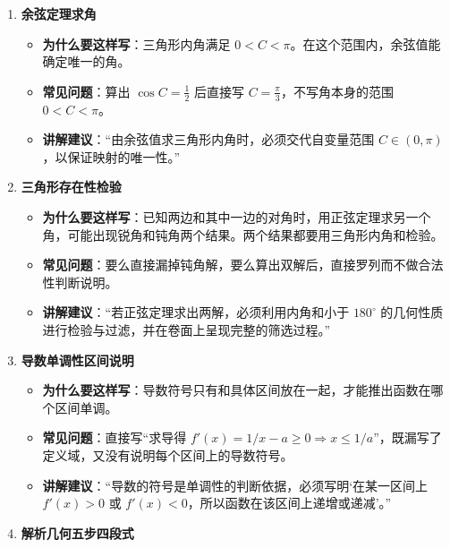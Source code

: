 \documentclass[11pt,a4paper]{ctexart}
\begin{document}
{\begin{enumerate}[label=\arabic*. , leftmargin=2em, itemsep=0.3em]
\begin{itemize}[leftmargin=1.5em, itemsep=0.1em]
        \item \textbf{常见问题}：直接写 \(\sin A = a\)，混淆边长和正弦值。
        \item \textbf{讲解建议}：“边与角正弦值成比例但不相等，边角转化时必须声明‘设外接圆半径为 \(R\)’，引入比例常数以保证步骤的量纲和逻辑严密。”
      \end{itemize}
    \item \textbf{余弦定理求角}
      \begin{itemize}[leftmargin=1.5em, itemsep=0.1em]
        \item \textbf{为什么要这样写}：三角形内角满足 \(0<C<\pi\)。在这个范围内，余弦值能确定唯一的角。
        \item \textbf{常见问题}：算出 \(\cos C = \frac{1}{2}\) 后直接写 \(C = \frac{\pi}{3}\)，不写角本身的范围 \(0 < C < \pi\)。
        \item \textbf{讲解建议}：“由余弦值求三角形内角时，必须交代自变量范围 \(C \in (0, \pi)\)，以保证映射的唯一性。”
      \end{itemize}
    \item \textbf{三角形存在性检验}
      \begin{itemize}[leftmargin=1.5em, itemsep=0.1em]
        \item \textbf{为什么要这样写}：已知两边和其中一边的对角时，用正弦定理求另一个角，可能出现锐角和钝角两个结果。两个结果都要用三角形内角和检验。
        \item \textbf{常见问题}：要么直接漏掉钝角解，要么算出双解后，直接罗列而不做合法性判断说明。
        \item \textbf{讲解建议}：“若正弦定理求出两解，必须利用内角和小于 \(180^\circ\) 的几何性质进行检验与过滤，并在卷面上呈现完整的筛选过程。”
      \end{itemize}
    \item \textbf{导数单调性区间说明}
      \begin{itemize}[leftmargin=1.5em, itemsep=0.1em]
        \item \textbf{为什么要这样写}：导数符号只有和具体区间放在一起，才能推出函数在哪个区间单调。
        \item \textbf{常见问题}：直接写“求导得 \(f'(x) = 1/x - a \ge 0 \Rightarrow x \le 1/a\)”，既漏写了定义域，又没有说明每个区间上的导数符号。
        \item \textbf{讲解建议}：“导数的符号是单调性的判断依据，必须写明‘在某一区间上 \(f'(x)>0\) 或 \(f'(x)<0\)，所以函数在该区间上递增或递减’。”
      \end{itemize}
    \item \textbf{解析几何五步四段式}

\end{enumerate}}
\end{document}
